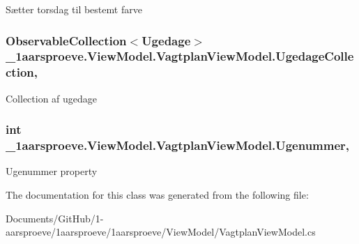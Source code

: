 Sætter torsdag til bestemt farve 

\hypertarget{class__1aarsproeve_1_1_view_model_1_1_vagtplan_view_model_a2c5e8d56bdec0db35b7e4c4d3f5a8bcb}{}
\subsubsection[{Ugedage\+Collection}]{\setlength{\rightskip}{0pt plus 5cm}Observable\+Collection$<$Ugedage$>$ \+\_\+1aarsproeve.\+View\+Model.\+Vagtplan\+View\+Model.\+Ugedage\+Collection\hspace{0.3cm}{\ttfamily [get]}, {\ttfamily [set]}}\label{class__1aarsproeve_1_1_view_model_1_1_vagtplan_view_model_a2c5e8d56bdec0db35b7e4c4d3f5a8bcb}


Collection af ugedage 

\hypertarget{class__1aarsproeve_1_1_view_model_1_1_vagtplan_view_model_a34eaf9433fb67fa445834864cc4117d4}{}
\subsubsection[{Ugenummer}]{\setlength{\rightskip}{0pt plus 5cm}int \+\_\+1aarsproeve.\+View\+Model.\+Vagtplan\+View\+Model.\+Ugenummer\hspace{0.3cm}{\ttfamily [get]}, {\ttfamily [set]}}\label{class__1aarsproeve_1_1_view_model_1_1_vagtplan_view_model_a34eaf9433fb67fa445834864cc4117d4}


Ugenummer property 



The documentation for this class was generated from the following file\+:\begin{DoxyCompactItemize}
\item 
Documents/\+Git\+Hub/1-\/aarsproeve/1aarsproeve/1aarsproeve/\+View\+Model/Vagtplan\+View\+Model.\+cs\end{DoxyCompactItemize}
